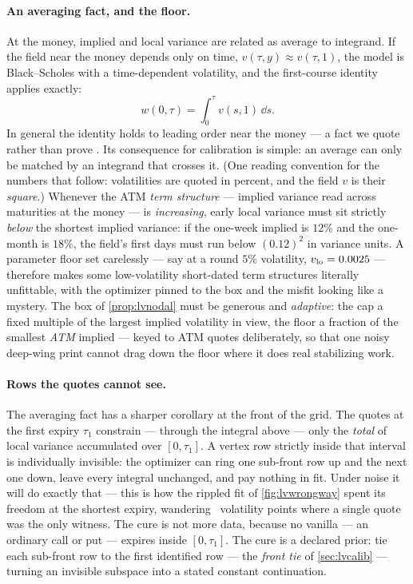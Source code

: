 \paragraph{An averaging fact, and the floor.}
At the money, implied and local variance are related as average to
integrand.  If the field near the money depends only on time,
$v(\tau,y)\approx v(\tau,1)$, the model is Black--Scholes with a
time-dependent volatility, and the first-course identity applies
exactly:
\[
w(0,\tau)=\int_0^{\tau}v(s,1)\,\dd s .
\]
In general the identity holds to leading order near the money --- a
fact we quote rather than prove \citep{Gatheral2006}.  Its
consequence for calibration is simple: an average can only be matched
by an integrand that crosses it.  (One reading convention for the
numbers that follow: volatilities are quoted in percent, and the field
$v$ is their \emph{square}.)  Whenever the ATM \emph{term structure}
--- implied variance read across maturities at the money --- is
\emph{increasing}, early local variance must sit strictly \emph{below}
the shortest implied variance: if the one-week implied is $12\%$
and the one-month is $18\%$, the field's first days must run below
$(0.12)^{2}$ in variance units.  A parameter floor set carelessly ---
say at a round $5\%$ volatility, $v_{\rm lo}=0.0025$ --- therefore
makes some low-volatility short-dated term
structures literally unfittable, with the optimizer pinned to the box
and the misfit looking like a mystery.  The box of
\cref{prop:lvnodal} must be generous and \emph{adaptive}: the cap a
fixed multiple of the largest implied volatility in view, the floor a
fraction of the smallest \emph{ATM} implied --- keyed to ATM quotes
deliberately, so that one noisy deep-wing print cannot drag down the
floor where it does real stabilizing work.

\paragraph{Rows the quotes cannot see.}
The averaging fact has a sharper corollary at the front of the grid.
The quotes at the first expiry $\tau_1$ constrain --- through the
integral above --- only the \emph{total} of local variance accumulated
over $[0,\tau_1]$.  A vertex row strictly inside that interval is
individually invisible: the optimizer can ring one sub-front row up
and the next one down, leave every integral unchanged, and pay nothing
in fit.  Under noise it will do exactly that --- this is how the
rippled fit of \cref{fig:lvwrongway} spent its freedom at the shortest
expiry, wandering \MacLvWrongEdgePts\ volatility points where a single
quote was the only witness.  The cure is not more data, because no
vanilla --- an ordinary call or put --- expires inside $[0,\tau_1]$.  The cure is a declared
prior: tie each sub-front row to the first identified row --- the
\emph{front tie} of \cref{sec:lvcalib} --- turning an invisible
subspace into a stated constant continuation.

